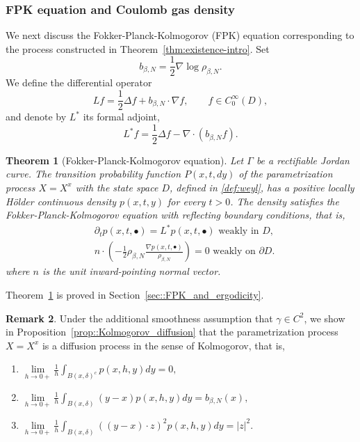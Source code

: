 \documentclass[11pt]{article}
\numberwithin{equation}{section}
\newtheorem{theorem}{Theorem}[section]
\theoremstyle{definition}
\newtheorem{remark}[theorem]{Remark}
\begin{document}
\subsubsection*{FPK equation and Coulomb gas density}
We next discuss the Fokker-Planck-Kolmogorov (FPK) equation corresponding to the process constructed in Theorem~\ref{thm:existence-intro}. Set \[b_{\beta,N}=\frac{1}{2}\nabla\log\rho_{\beta, N}.\] We define the differential operator 
\begin{equation}\label{eq::operator_L}
    Lf = \frac{1}{2}\Delta f + b_{\beta,N}\cdot \nabla f,\qquad f\in C_{0}^{\infty}(D),
\end{equation}
and denote by $L^{*}$ its formal adjoint,
\begin{equation}\label{eq::adjoint_operator}
    L^{*}f = \frac{1}{2}\Delta f - \nabla\cdot\left( b_{\beta,N}f\right).
\end{equation}
\begin{theorem}[Fokker-Planck-Kolmogorov equation]\label{thm:FPK-intro}
Let $\Gamma$ be a rectifiable Jordan curve.  The transition probability function $P(x,t,dy)$ of the parametrization process $X=X^{x}$ with the state space $D$, defined in \eqref{def:weyl}, has a positive locally Hölder continuous density $p(x,t,y)$ for every $t>0$. The density satisfies the Fokker-Planck-Kolmogorov equation with reflecting boundary conditions, that is,
\begin{align*}
    &\partial_{t}p(x,t,\bullet)=L^{*}p(x,t,\bullet) \text{ weakly in }D,\\
    &n\cdot\left(-\frac{1}{2}\rho_{\beta,N}\frac{\nabla p(x,t,\bullet)}{\rho_{\beta,N}} \right) = 0 \text{ weakly on }\partial D.
\end{align*}
where $n$ is the unit inward-pointing normal vector.
\end{theorem}
\noindent Theorem~\ref{thm:FPK-intro} is proved in Section~\ref{sec::FPK_and_ergodicity}.
\begin{remark}
Under the additional smoothness assumption that $\gamma \in C^{2}$, we show in Proposition~\ref{prop::Kolmogorov_diffusion} that the parametrization process $X=X^x$ is a diffusion process in the sense of Kolmogorov, that is, 
\begin{enumerate}
    \item $\lim\limits_{h\to 0+}\frac{1}{h}\int_{B(x,\delta)^{c}}p(x,h,y)dy=0,$
    \item $\lim\limits_{h\to 0+}\frac{1}{h}\int_{B(x,\delta)}(y-x)p(x,h,y)dy = b_{\beta,N}(x),$
    \item $\lim\limits_{h\to 0+}\frac{1}{h}\int_{B(x,\delta)}((y-x)\cdot z )^2p(x,h,y)dy= |z|^2.$
\end{enumerate}  
\end{remark}
\end{document}

